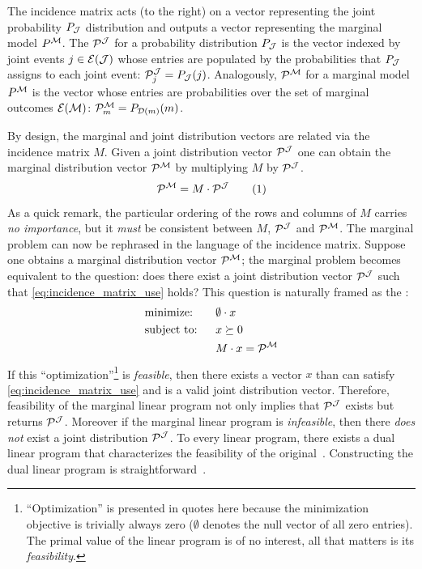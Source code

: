 \documentclass[aps, 10pt, english, twoside, pra, nofootinbib, tightenlines, longbibliography, superscriptaddress]{revtex4-1}
\begin{document}
    The incidence matrix acts (to the right) on a vector representing the joint probability $\prob[\jointvar]$ distribution and outputs a vector representing the marginal model $\prob^{\mscenario}$. The  $\probvec^{\jointvar}$ for a probability distribution $\prob[\jointvar]$ is the vector indexed by joint events $j \in \Events{\jointvar}$ whose entries are populated by the probabilities that $\prob[\jointvar]$ assigns to each joint event: $\probvec^{\jointvar}_j = \prob[\jointvar][j]$. Analogously,  $\probvec^{\mscenario}$ for a marginal model $\prob^{\mscenario}$ is the vector whose entries are probabilities over the set of marginal outcomes $\Events{\mscenario}$: $\probvec^{\mscenario}_m = \prob[\Dom{m}][m]$.

    By design, the marginal and joint distribution vectors are related via the incidence matrix $M$. Given a joint distribution vector $\probvec^{\jointvar}$ one can obtain the marginal distribution vector $\probvec^{\mscenario}$ by multiplying $M$ by $\probvec^{\jointvar}$.
    \[ \probvec^{\mscenario} = M \cdot \probvec^{\jointvar} \eq \label{eq:incidence_matrix_use} \]
    As a quick remark, the particular ordering of the rows and columns of $M$ carries \textit{no importance}, but it \textit{must} be consistent between $M$, $\probvec^{\jointvar}$ and $\probvec^{\mscenario}$. The marginal problem can now be rephrased in the language of the incidence matrix. Suppose one obtains a marginal distribution vector $\probvec^{\mscenario}$; the marginal problem becomes equivalent to the question: does there exist a joint distribution vector $\probvec^{\jointvar}$ such that \cref{eq:incidence_matrix_use} holds? This question is naturally framed as the :
    \begin{equation}
    \begin{aligned}
        & \text{minimize:} \quad&& \emptyset \cdot x\\
        & \text{subject to:} && x \succeq 0 \\
        & && M \cdot x = \probvec^{\mscenario}
    \end{aligned}
    \end{equation}
    If this ``optimization''\footnote{``Optimization'' is presented in quotes here because the minimization objective is trivially always zero ($\emptyset$ denotes the null vector of all zero entries). The primal value of the linear program is of no interest, all that matters is its \textit{feasibility}.} is \textit{feasible}, then there exists a vector $x$ than can satisfy \cref{eq:incidence_matrix_use} and is a valid joint distribution vector. Therefore, feasibility of the marginal linear program not only implies that $\probvec^{\jointvar}$ exists but returns $\probvec^{\jointvar}$. Moreover if the marginal linear program is \textit{infeasible}, then there \textit{does not} exist a joint distribution $\probvec^{\jointvar}$. To every linear program, there exists a dual linear program that characterizes the feasibility of the original~\cite{Schrijver_1998}. Constructing the dual linear program is straightforward~\cite{Lahaie_2008}.
\end{document}
